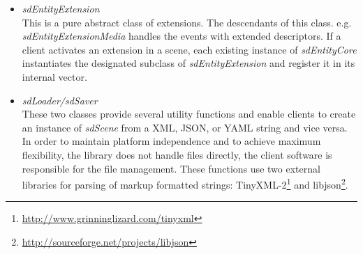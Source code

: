 \documentclass{article}
\begin{document}
\begin{itemize}[leftmargin=-0.0mm]
\item[] \emph{sdEntityExtension}\\
This is a pure abstract class of extensions. The descendants of this class. e.g. \emph{sdEntityExtensionMedia} handles the events with extended descriptors. 
If a client activates an extension in a scene, each existing instance of \emph{sdEntityCore} instantiates the designated subclass of \emph{sdEntityExtension} and register it in its internal vector.

\item[] \emph{sdLoader/sdSaver}\\
These two classes provide several utility functions and enable clients to create an instance of \emph{sdScene} from a XML, JSON, or YAML string and vice versa. 
In order to maintain platform independence and to achieve maximum flexibility, the library does not handle files directly, the client software is responsible for the file management. 
These functions use two external libraries for parsing of markup formatted strings: TinyXML-2\footnote{\url{http://www.grinninglizard.com/tinyxml} } and libjson\footnote{\url{http://sourceforge.net/projects/libjson} }.
\end{itemize}

% 
%  
% 
%  
% 
% 
% 
% 
% 
% 
\end{document}
